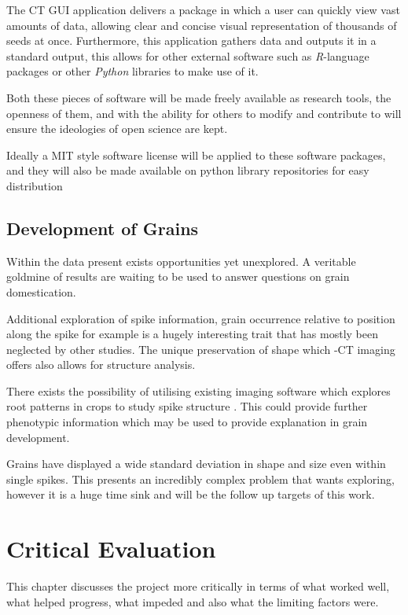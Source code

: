 \documentclass[11pt]{report}
\begin{document}
The CT GUI application delivers a package in which a user can quickly view vast amounts of data, allowing clear and concise visual representation of thousands of seeds at once. Furthermore, this application gathers data and outputs it in a standard output, this allows for other external software such as \emph{R}-language packages or other \emph{Python} libraries to make use of it.

Both these pieces of software will be made freely available as research tools, the openness of them, and with the ability for others to modify and contribute to will ensure the ideologies of open science are kept.

Ideally a MIT style software license will be applied to these software packages, and they will also be made available on python library repositories for easy distribution

\section{Development of Grains}
\label{sec:org46102a9}
Within the data present exists opportunities yet unexplored. A veritable goldmine of results are waiting to be used to answer questions on grain domestication.

Additional exploration of spike information, grain occurrence relative to position along the spike for example is a hugely interesting trait that has mostly been neglected by other studies. The unique preservation of shape which \textmu{}-CT imaging offers also allows for structure analysis.

There exists the possibility of utilising existing imaging software which explores root patterns in crops to study spike structure \cite{Mairhofer2015,Daly2017}. This could provide further phenotypic information which may be used to provide explanation in grain development.

Grains have displayed a wide standard deviation in shape and size even within single spikes. This presents an incredibly complex problem that wants exploring, however it is a huge time sink and will be the follow up targets of this work.

\chapter{Critical Evaluation}
\label{sec:orgde3cc38}
This chapter discusses the project more critically in terms of what worked well, what helped progress, what impeded and also what the limiting factors were.
\end{document}
